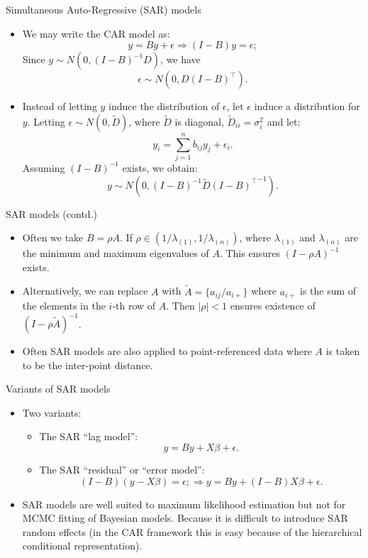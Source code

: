 \documentclass[10pt]{beamer}
\begin{document}
\begin{frame}{ Simultaneous Auto-Regressive (SAR) models
}

\begin{itemize}
 \item We may write the CAR model as:
\[
 y = By + \epsilon \Rightarrow (I - B)y = \epsilon;
\]
Since $y \sim N(0, (I-B)^{-1}D)$, we have
\[
 \epsilon \sim N(0, D(I-B)^{\top}).
\]

\item Instead of letting $y$ induce the distribution of $\epsilon$, let $\epsilon$  induce a distribution for $y$. Letting $\epsilon \sim N(0,\tilde{D})$, where $\tilde{D}$ is diagonal, $\tilde{D}_{ii}=\sigma^2_{i}$ and let:
\[
 y_i = \sum_{j=1}^{n}b_{ij}y_j + \epsilon_i.
\]
Assuming $(I-B)^{-1}$ exists, we obtain:
\[
 y \sim N\left(0, (I-B)^{-1}\tilde{D}{(I-B)^{\top}}^{-1}\right).
\]

\end{itemize}

\end{frame}

\begin{frame}{SAR models (contd.)}
 
\begin{itemize}
 \item Often we take $B = \rho A$. If $\rho\in (1/\lambda_{(1)},1/\lambda_{(n)})$, where $\lambda_{(1)}$ and $\lambda_{(n)}$ are the minimum and maximum eigenvalues of $A$. This ensures $(I-\rho A)^{-1}$ exists.

 \item Alternatively, we can replace $A$ with $\tilde{A} = \{a_{ij}/a_{i+}\}$ where $a_{i+}$ is the sum of the elements in the $i$-th row of $A$. Then $|\rho| < 1$ ensures existence of $(I-\rho\tilde{A})^{-1}$.

 \item Often SAR models are also applied to point-referenced data where $A$ is taken to be the inter-point distance.

\end{itemize}

\end{frame}

\begin{frame}{Variants of SAR models}
 
 \begin{itemize}
   \item Two variants:
	\begin{itemize}
	\item The SAR ``lag model'':
	\[
 		y = By + X\beta + \epsilon.
	\]
	\item The SAR ``residual'' or ``error model'':
	\[
	  (I-B)(y-X\beta) = \epsilon; \Rightarrow y = By + (I-B)X\beta + \epsilon.	
	\]
	\end{itemize}
 
\item SAR models are well suited to maximum likelihood estimation but not for MCMC fitting of Bayesian models. Because it is difficult to introduce SAR random effects (in the CAR framework this is easy because of the hierarchical conditional representation).
 \end{itemize}

\end{frame}
\end{document}

